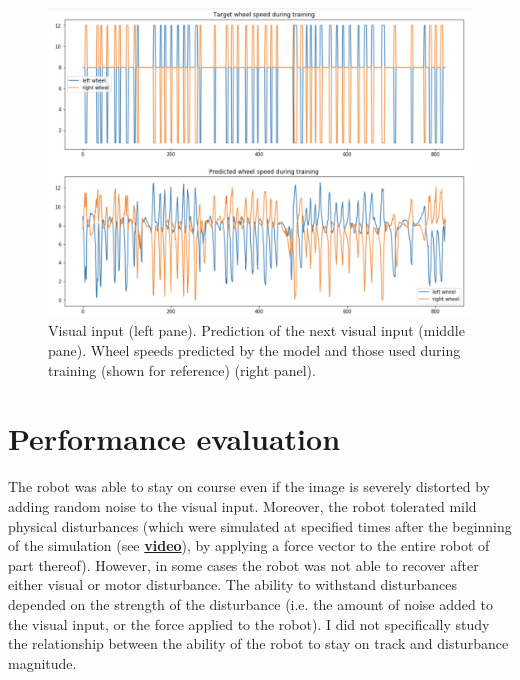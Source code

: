 \documentclass[11pt, oneside]{article}   	%
\begin{document}
\begin{figure}[h]
\includegraphics[width=\columnwidth]{Fig_6} 
\caption{Visual input (left pane). Prediction of the next visual input (middle pane). Wheel speeds predicted by the model and those used during training (shown for reference) (right panel). }
\label{fig:whsp}
\end{figure}

\section{Performance evaluation}
The robot was able to stay on course even if the image is severely distorted by adding random noise to the visual input. Moreover, the robot tolerated mild physical disturbances (which were simulated at specified times after the beginning of the simulation (see \href{https://youtu.be/nAUBwK1vufM}{\textbf{video}}), by applying a force vector to the entire robot of part thereof). However, in some cases the robot was not able to recover after either visual or motor disturbance. The ability to withstand disturbances depended on the strength of the disturbance (i.e. the amount of noise added to the visual input, or the force applied to the robot). I did not specifically study the relationship between the ability of the robot to stay on track and disturbance magnitude.
\end{document}
